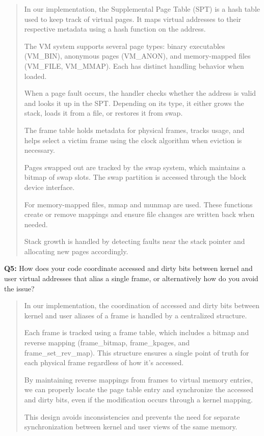 \documentclass[a4paper,11pt]{paper}
\begin{document}
\begin{quote}
In our implementation, the Supplemental Page Table (SPT) is a hash table used to keep track of virtual pages. It maps virtual addresses to their respective metadata using a hash function on the address.

The VM system supports several page types: binary executables (VM\_BIN), anonymous pages (VM\_ANON), and memory-mapped files (VM\_FILE, VM\_MMAP). Each has distinct handling behavior when loaded.

When a page fault occurs, the handler checks whether the address is valid and looks it up in the SPT. Depending on its type, it either grows the stack, loads it from a file, or restores it from swap.

The frame table holds metadata for physical frames, tracks usage, and helps select a victim frame using the clock algorithm when eviction is necessary.

Pages swapped out are tracked by the swap system, which maintains a bitmap of swap slots. The swap partition is accessed through the block device interface.

For memory-mapped files, mmap and munmap are used. These functions create or remove mappings and ensure file changes are written back when needed.

Stack growth is handled by detecting faults near the stack pointer and allocating new pages accordingly.
\end{quote}


\textbf{Q5:} How does your code coordinate accessed and dirty bits between kernel and user virtual addresses that alias a single frame, or alternatively how do you avoid the issue?

\begin{quote}
In our implementation, the coordination of accessed and dirty bits between kernel and user aliases of a frame is handled by a centralized structure.

Each frame is tracked using a frame table, which includes a bitmap and reverse mapping (frame\_bitmap, frame\_kpages, and frame\_set\_rev\_map). This structure ensures a single point of truth for each physical frame regardless of how it's accessed.

By maintaining reverse mappings from frames to virtual memory entries, we can properly locate the page table entry and synchronize the accessed and dirty bits, even if the modification occurs through a kernel mapping.

This design avoids inconsistencies and prevents the need for separate synchronization between kernel and user views of the same memory.
\end{quote}
\end{document}
